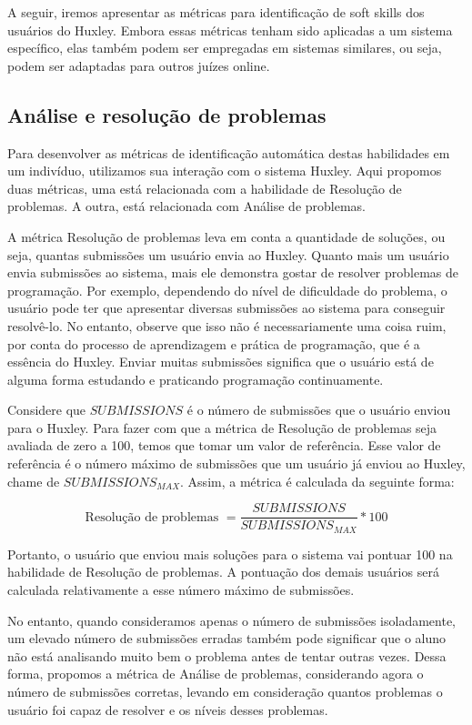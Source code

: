A seguir, iremos apresentar as métricas para identificação de soft skills dos usuários do Huxley. Embora essas métricas tenham sido aplicadas a um sistema específico, elas também  podem ser empregadas em sistemas similares, ou seja, podem ser adaptadas para outros juízes online.

\subsection{Análise e resolução de problemas}

Para desenvolver as métricas de identificação automática destas habilidades em um indivíduo, utilizamos sua interação com o sistema Huxley. Aqui propomos duas métricas, uma está relacionada com a habilidade de Resolução de problemas. A outra, está relacionada com Análise de problemas.

A métrica Resolução de problemas leva em conta a quantidade de soluções, ou seja, quantas submissões um usuário envia ao Huxley. Quanto mais um usuário envia submissões ao sistema, mais ele demonstra gostar de resolver problemas de programação. Por exemplo, dependendo do nível de dificuldade do problema, o usuário pode ter que apresentar diversas submissões ao sistema para conseguir resolvê-lo. No entanto, observe que isso não é necessariamente uma coisa ruim, por conta do processo de aprendizagem e prática de programação, que é a essência do Huxley. Enviar muitas submissões significa que o usuário está de alguma forma estudando e praticando programação continuamente.

Considere que $SUBMISSIONS$ é o número de submissões que o usuário enviou para o Huxley. 
Para fazer com que a métrica de Resolução de problemas seja avaliada de zero a 100, temos que tomar um valor de referência. Esse valor de referência é o número máximo de submissões que um usuário já enviou ao Huxley, chame de $SUBMISSIONS_{MAX}$. Assim, a métrica é calculada da seguinte forma:

\begin{equation} \label{m:resolucao}
\mbox{Resolução de problemas } = \frac{SUBMISSIONS}{SUBMISSIONS_{MAX}} * 100
\end{equation}

Portanto, o usuário que enviou mais soluções para o sistema vai pontuar 100 na habilidade de Resolução de problemas. A pontuação dos demais usuários será calculada relativamente a esse número máximo de submissões.

No entanto, quando consideramos apenas o número de submissões isoladamente, um elevado número de submissões erradas também pode significar que o aluno não está analisando muito bem o problema antes de tentar outras vezes. Dessa forma, propomos a métrica de Análise de problemas, considerando agora o número de submissões corretas, levando em consideração quantos problemas o usuário foi capaz de resolver e os níveis desses problemas.

